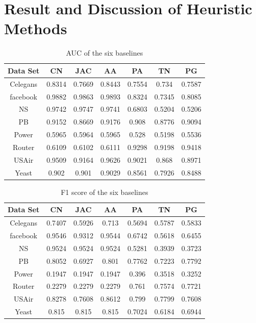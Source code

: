 \documentclass[12pt]{article}
\begin{document}
\section{Result and Discussion of Heuristic Methods}
\begin{table}
	\begin{center}
		\begin{tabular}{|c|c|c|c|c|c|c|}
			\hline
			Data Set & CN & JAC & AA & PA  & TN & PG \\
			\hline
			Celegans&0.8314&0.7669&0.8443&0.7554&0.734&0.7587\\
			facebook&0.9882&0.9863&0.9893&0.8324&0.7345&0.8085\\
			NS&0.9742&0.9747&0.9741&0.6803&0.5204&0.5206\\
			PB&0.9152&0.8669&0.9176&0.908&0.8776&0.9094\\
			Power&0.5965&0.5964&0.5965&0.528&0.5198&0.5536\\
			Router&0.6109&0.6102&0.6111&0.9298&0.9198&0.9418\\
			USAir&0.9509&0.9164&0.9626&0.9021&0.868&0.8971\\
			Yeast&0.902&0.901&0.9029&0.8561&0.7926&0.8488\\
			\hline
		\end{tabular}
	\end{center}
	\caption{AUC of the six baselines}
	\label{tab:auc}
\end{table}

\begin{table}
	\begin{center}
		\begin{tabular}{|c|c|c|c|c|c|c|}
			\hline
			Data Set & CN & JAC & AA & PA & TN & PG \\
			\hline
			Celegans&0.7407&0.5926&0.713&0.5694&0.5787&0.5833\\
			facebook&0.9546&0.9312&0.9544&0.6742&0.5618&0.6455\\
			NS&0.9524&0.9524&0.9524&0.5281&0.3939&0.3723\\
			PB&0.8052&0.6927&0.801&0.7762&0.7223&0.7792\\
			Power&0.1947&0.1947&0.1947&0.396&0.3518&0.3252\\
			Router&0.2279&0.2279&0.2279&0.761&0.7574&0.7721\\
			USAir&0.8278&0.7608&0.8612&0.799&0.7799&0.7608\\
			Yeast&0.815&0.815&0.815&0.7024&0.6184&0.6944\\
			\hline
		\end{tabular}
	\end{center}
	\caption{F1 score of the six baselines}
	\label{tab:f1}
\end{table}
\end{document}
